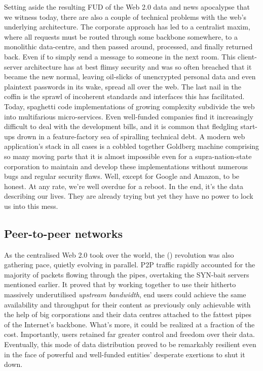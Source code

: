 Setting aside the resulting FUD of the Web 2.0 data and news apocalypse that we witness today, there are also a couple of technical problems with the web's underlying architecture. The corporate approach has led to a centralist maxim, where  all requests must be routed through some backbone somewhere, to a monolithic data-centre, and then passed around, processed, and finally returned back. Even if to simply send a message to someone in the next room. This client-server architecture has at best flimsy security and was so often breached that it became the new normal, leaving oil-slicks of unencrypted personal data and even plaintext passwords in its wake, spread all over the web. The last nail in the coffin is the sprawl of incoherent standards and interfaces this has facilitated. Today, spaghetti code implementations of growing complexity subdivide the web into multifarious micro-services. Even well-funded companies find it increasingly difficult to deal with the development bills, and it is common  that fledgling start-ups drown in a feature-factory sea of spiralling technical debt. A modern web application's stack in all cases is a cobbled together Goldberg machine comprising so many moving parts that it is almost impossible even for a supra-nation-state corporation to maintain and develop these implementations without numerous bugs and regular security flaws. Well, except for Google and Amazon, to be honest. At any rate, we're well overdue for a reboot. In the end, it's the data describing our lives. They are already trying but yet they have no power to lock us into this mess.


\subsection{Peer-to-peer networks \statusgreen}\label{sec:peer_to_peer}

As the centralised Web 2.0 took over the world, the  () revolution was also gathering pace, quietly evolving in parallel. P2P traffic rapidly accounted for the majority of packets flowing through the pipes, overtaking the SYN-bait servers mentioned earlier. It proved that by working together to use their hitherto massively underutilised \emph{upstream bandwidth}, end users could achieve the same availability and throughput for their content as previously only achievable with the help of big corporations and their data centres attached to the fattest pipes of the Internet's backbone. What's more, it could be realized at a fraction of the cost. Importantly, users retained far greater control and freedom over their data. Eventually, this mode of data distribution proved to be remarkably resilient even in the face of powerful and well-funded entities' desperate exertions to shut it down.

